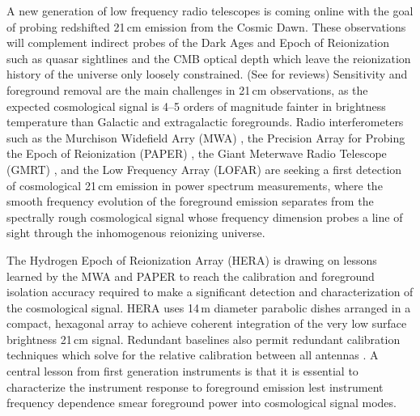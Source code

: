\documentclass{emulateapj}
\begin{document}
A new generation of low frequency radio telescopes is coming online with the goal of
 probing redshifted 21\,cm emission from the Cosmic Dawn. These observations will 
 complement indirect probes of the Dark Ages and Epoch of Reionization such as quasar 
 sightlines and the CMB optical depth which leave the reionization 
 history of the universe only loosely constrained. (See \citet{FurlanettoReview, miguelreview, PritchardLoebReview, aviBook, zaroubi} for reviews) Sensitivity and foreground removal are 
 the main challenges in 21\,cm observations, as the expected cosmological signal is 4--5 
 orders of magnitude fainter in brightness temperature than Galactic and extragalactic foregrounds. Radio 
 interferometers such as the Murchison Widefield Arry (MWA) \citep{tingay13,mwascience}, the Precision Array for Probing the Epoch of Reionization (PAPER) \citep{ali2015}, the Giant Meterwave Radio Telescope (GMRT) 
 \citep{Paciga2011}, and the Low Frequency Array (LOFAR) \citep{lofar} are seeking a first detection of 
 cosmological 21\,cm emission in power spectrum measurements, where the smooth 
 frequency evolution of the foreground emission separates from the spectrally 
 rough cosmological signal whose frequency dimension probes a line of sight through the 
 inhomogenous reionizing universe.


The Hydrogen Epoch of Reionization Array (HERA) \citep[][deBoer et al. (in prep)]{PoberNextGen} is drawing on lessons learned by the MWA and PAPER to reach the calibration and foreground isolation accuracy required to make a significant detection and characterization of the cosmological signal. HERA uses 14\,m diameter parabolic dishes arranged in a compact, hexagonal array to achieve coherent integration of the very low surface brightness 21\,cm signal. Redundant baselines also permit redundant calibration techniques which solve for the relative calibration between all antennas \citep{liu2010,zheng14}. A central lesson from first generation instruments is that it is essential to characterize the instrument response to foreground emission lest instrument frequency dependence smear foreground power into cosmological signal modes. 

\end{document}
